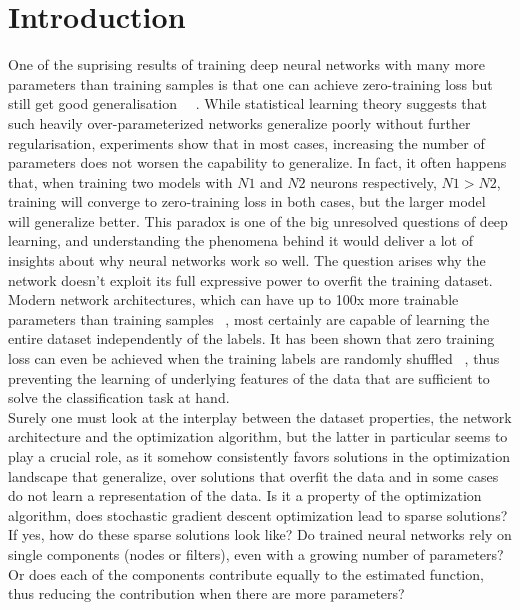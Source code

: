 \setlength\parindent{0pt}

\section{Introduction}
One of the suprising results of training deep neural networks with many more parameters than training samples is that one can achieve zero-training loss but still get good generalisation ~~\autocite{neyshabur2018towards}. While statistical learning theory suggests that such heavily over-parameterized networks generalize poorly without further regularisation, experiments show that in most cases, increasing the number of parameters does not worsen the capability to generalize. In fact, it often happens that, when training two models with $N1$ and $N2$ neurons respectively, $N1 > N2$, training will converge to zero-training loss in both cases, but the larger model will generalize better. This paradox is one of the big unresolved questions of deep learning, and understanding the phenomena behind it would deliver a lot of insights about why neural networks work so well. The question arises why the network doesn't exploit its full expressive power to overfit the training dataset. Modern network architectures, which can have up to 100x more trainable parameters than training samples ~\autocite{zagoruyko2016wide}, most certainly are capable of learning the entire dataset independently of the labels. It has been shown that zero training loss can even be achieved when the training labels are randomly shuffled ~\autocite{zhang2016understanding}, thus preventing the learning of underlying features of the data that are sufficient to solve the classification task at hand. \\

Surely one must look at the interplay between the dataset properties, the network architecture and the optimization algorithm, but the latter in particular seems to play a crucial role, as it somehow consistently favors solutions in the optimization landscape that generalize, over solutions that overfit the data and in some cases do not learn a representation of the data. Is it a property of the optimization algorithm, does stochastic gradient descent optimization lead to sparse solutions? If yes, how do these sparse solutions look like? Do trained neural networks rely on single components (nodes or filters), even with a growing number of parameters? Or does each of the components contribute equally to the estimated function, thus reducing the contribution when there are more parameters? \\

